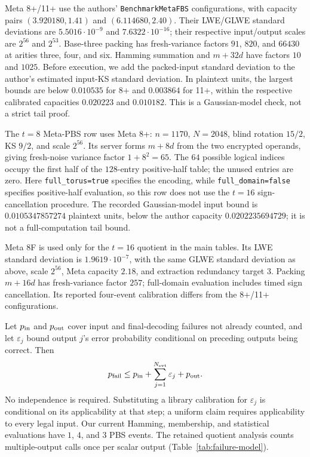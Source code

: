 \documentclass[11pt,a4paper]{article}
\begin{document}
Meta 8+/11+ use the authors' \texttt{BenchmarkMetaFBS} configurations, with capacity pairs $(3.920180,1.41)$ and $(6.114680,2.40)$. Their LWE/GLWE standard deviations are $5.5016\cdot10^{-9}$ and $7.6322\cdot10^{-16}$; their respective input/output scales are $2^{56}$ and $2^{53}$. Base-three packing has fresh-variance factors $91$, $820$, and $66430$ at arities three, four, and six. Hamming summation and $m+32d$ have factors $10$ and $1025$. Before execution, we add the packed-input standard deviation to the author's estimated input-KS standard deviation. In plaintext units, the largest bounds are below $0.010535$ for 8+ and $0.003864$ for 11+, within the respective calibrated capacities $0.020223$ and $0.010182$. This is a Gaussian-model check, not a strict tail proof.

The $t=8$ Meta-PBS row uses Meta 8+: $n=1170$, $N=2048$, blind rotation $15/2$, KS $9/2$, and scale $2^{56}$. Its server forms $m+8d$ from the two encrypted operands, giving fresh-noise variance factor $1+8^2=65$. The $64$ possible logical indices occupy the first half of the $128$-entry positive-half table; the unused entries are zero. Here \texttt{full\_torus=true} specifies the encoding, while \texttt{full\_domain=false} specifies positive-half evaluation, so this row does not use the $t=16$ sign-cancellation procedure. The recorded Gaussian-model input bound is $0.0105347857274$ plaintext units, below the author capacity $0.0202235694729$; it is not a full-computation tail bound.

Meta 8F is used only for the $t=16$ quotient in the main tables. Its LWE standard deviation is $1.9619\cdot10^{-7}$, with the same GLWE standard deviation as above, scale $2^{56}$, Meta capacity $2.18$, and extraction redundancy target $3$. Packing $m+16d$ has fresh-variance factor $257$; full-domain evaluation includes timed sign cancellation. Its reported four-event calibration differs from the 8+/11+ configurations.



Let $p_{\rm in}$ and $p_{\rm out}$ cover input and final-decoding failures not already counted, and let $\varepsilon_j$ bound output $j$'s error probability conditional on preceding outputs being correct. Then
\[
 p_{\rm fail}\le p_{\rm in}+\sum_{j=1}^{N_{\rm evt}}\varepsilon_j+p_{\rm out}.
\]
No independence is required. Substituting a library calibration for $\varepsilon_j$ is conditional on its applicability at that step; a uniform claim requires applicability to every legal input. Our current Hamming, membership, and statistical evaluations have $1$, $4$, and $3$ PBS events. The retained quotient analysis counts multiple-output calls once per scalar output (Table~\ref{tab:failure-model}).
\end{document}
